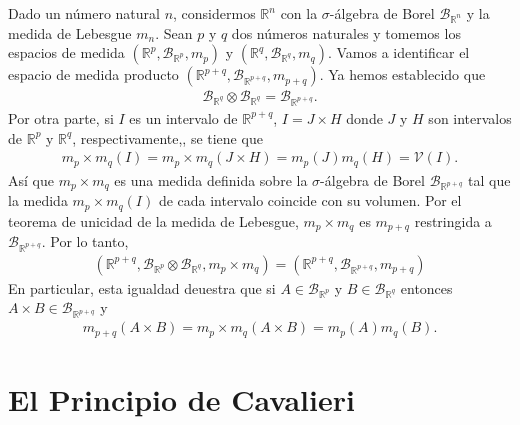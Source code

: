 \begin{obs}
    Dado un número natural $n$, considermos $\mathbb{R}^n$ con la $\sigma$-álgebra de Borel $\mathcal{B}_{\mathbb{R}^n}$ y la medida de Lebesgue $m_n$. Sean $p$ y $q$ dos números naturales y tomemos los espacios de medida $(\mathbb{R}^p, \mathcal{B}_{\mathbb{R}^p}, m_p)$ y $(\mathbb{R}^q, \mathcal{B}_{\mathbb{R}^q}, m_q)$. Vamos a identificar el espacio de medida producto $(\mathbb{R}^{p+q}, \mathcal{B}_{\mathbb{R}^{p+q}}, m_{p+q})$. Ya hemos establecido que
    \begin{align*}
        \mathcal{B}_{\mathbb{R}^q} \otimes \mathcal{B}_{\mathbb{R}^q} = \mathcal{B}_{\mathbb{R}^{p+q}}.
    \end{align*}
    Por otra parte, si $I$ es un intervalo de $\mathbb{R}^{p+q}$, $I = J \times H$ donde $J$ y $H$ son intervalos de $\mathbb{R}^p$ y $\mathbb{R}^q$, respectivamente,, se tiene que
    \begin{align*}
        m_p \times m_q(I) = m_p \times m_q (J \times H) = m_p(J)m_q(H) = \mathcal{V}(I).
    \end{align*}
    Así que $m_p \times m_q$ es una medida definida sobre la $\sigma$-álgebra de Borel $\mathcal{B}_{\mathbb{R}^{p+q}}$ tal que la medida $m_p \times m_q(I)$ de cada intervalo coincide con su volumen. Por el teorema de unicidad de la medida de Lebesgue, $m_p \times m_q$ es $m_{p+q}$ restringida a $\mathcal{B}_{\mathbb{R}^{p+q}}$. Por lo tanto,
    \begin{align*}
        (\mathbb{R}^{p+q}, \mathcal{B}_{\mathbb{R}^p} \otimes \mathcal{B}_{\mathbb{R}^q}, m_p \times m_q) = (\mathbb{R}^{p+q}, \mathcal{B}_{\mathbb{R}^{p+q}}, m_{p+q})
    \end{align*}
    En particular, esta igualdad deuestra que si $A \in \mathcal{B}_{\mathbb{R}^p}$ y $B \in \mathcal{B}_{\mathbb{R}^q}$ entonces $A \times B \in \mathcal{B}_{\mathbb{R}^{p+q}}$ y
    \begin{align*}
        m_{p+q}(A \times B) = m_p \times m_q (A \times B) = m_p(A)m_q(B).
    \end{align*}
\end{obs}

\section{El Principio de Cavalieri}

